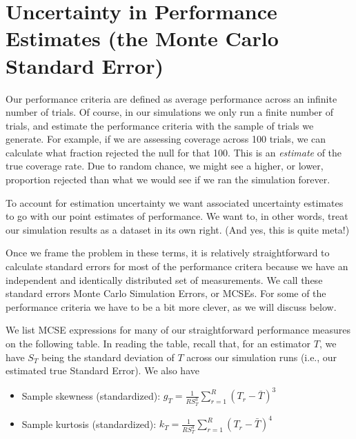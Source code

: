 \documentclass[
]{book}
\providecommand{\tightlist}{%
  \setlength{\itemsep}{0pt}\setlength{\parskip}{0pt}}
\begin{document}
\section{Uncertainty in Performance Estimates (the Monte Carlo Standard Error)}\label{uncertainty-in-performance-estimates-the-monte-carlo-standard-error}

Our performance criteria are defined as average performance across an infinite number of trials.
Of course, in our simulations we only run a finite number of trials, and estimate the performance criteria with the sample of trials we generate.
For example, if we are assessing coverage across 100 trials, we can calculate what fraction rejected the null for that 100.
This is an \emph{estimate} of the true coverage rate.
Due to random chance, we might see a higher, or lower, proportion rejected than what we would see if we ran the simulation forever.

To account for estimation uncertainty we want associated uncertainty estimates to go with our point estimates of performance.
We want to, in other words, treat our simulation results as a dataset in its own right.
(And yes, this is quite meta!)

Once we frame the problem in these terms, it is relatively straightforward to calculate standard errors for most of the performance critera because we have an independent and identically distributed set of measurements.
We call these standard errors Monte Carlo Simulation Errors, or MCSEs.
For some of the performance criteria we have to be a bit more clever, as we will discuss below.

We list MCSE expressions for many of our straightforward performance measures on the following table.
In reading the table, recall that, for an estimator \(T\), we have \(S_T\) being the standard deviation of \(T\) across our simulation runs (i.e., our estimated true Standard Error).
We also have

\begin{itemize}
\tightlist
\item
  Sample skewness (standardized): \(\displaystyle{g_T = \frac{1}{R S_T^3}\sum_{r=1}^R \left(T_r - \bar{T}\right)^3}\)
\item
  Sample kurtosis (standardized): \(\displaystyle{k_T = \frac{1}{R S_T^4} \sum_{r=1}^R \left(T_r - \bar{T}\right)^4}\)
\end{itemize}
\end{document}
